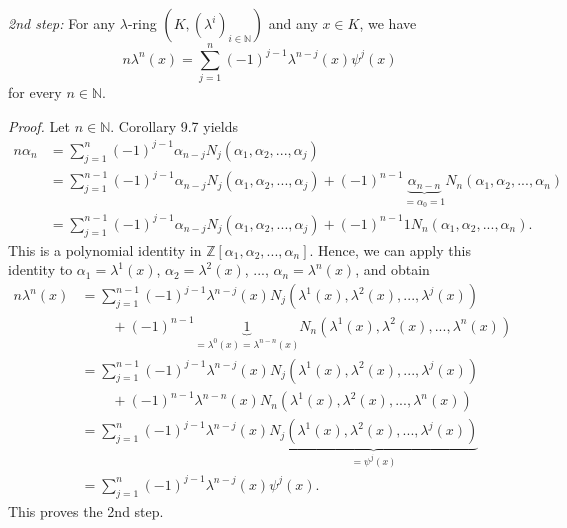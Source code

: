 \documentclass[numbers=enddot,12pt,final,onecolumn,notitlepage]{scrartcl}%
\begin{document}
\textit{2nd step:} For any $\lambda$-ring $\left(  K,\left(  \lambda
^{i}\right)  _{i\in\mathbb{N}}\right)  $ and any $x\in K$, we have%
\[
n\lambda^{n}\left(  x\right)  =\sum_{j=1}^{n}\left(  -1\right)  ^{j-1}%
\lambda^{n-j}\left(  x\right)  \psi^{j}\left(  x\right)
\]
for every $n\in\mathbb{N}$.

\textit{Proof.} Let $n\in\mathbb{N}$. Corollary 9.7 yields%
\begin{align*}
n\alpha_{n}  &  =\sum\limits_{j=1}^{n}\left(  -1\right)  ^{j-1}\alpha
_{n-j}N_{j}\left(  \alpha_{1},\alpha_{2},...,\alpha_{j}\right) \\
&  =\sum\limits_{j=1}^{n-1}\left(  -1\right)  ^{j-1}\alpha_{n-j}N_{j}\left(
\alpha_{1},\alpha_{2},...,\alpha_{j}\right)  +\left(  -1\right)
^{n-1}\underbrace{\alpha_{n-n}}_{=\alpha_{0}=1}N_{n}\left(  \alpha_{1}%
,\alpha_{2},...,\alpha_{n}\right) \\
&  =\sum\limits_{j=1}^{n-1}\left(  -1\right)  ^{j-1}\alpha_{n-j}N_{j}\left(
\alpha_{1},\alpha_{2},...,\alpha_{j}\right)  +\left(  -1\right)  ^{n-1}%
1N_{n}\left(  \alpha_{1},\alpha_{2},...,\alpha_{n}\right)  .
\end{align*}
This is a polynomial identity in $\mathbb{Z}\left[  \alpha_{1},\alpha
_{2},...,\alpha_{n}\right]  $. Hence, we can apply this identity to
$\alpha_{1}=\lambda^{1}\left(  x\right)  $, $\alpha_{2}=\lambda^{2}\left(
x\right)  $, $...$, $\alpha_{n}=\lambda^{n}\left(  x\right)  $, and obtain%
\begin{align*}
n\lambda^{n}\left(  x\right)   &  =\sum_{j=1}^{n-1}\left(  -1\right)
^{j-1}\lambda^{n-j}\left(  x\right)  N_{j}\left(  \lambda^{1}\left(  x\right)
,\lambda^{2}\left(  x\right)  ,...,\lambda^{j}\left(  x\right)  \right) \\
&  \ \ \ \ \ \ \ \ \ \ +\left(  -1\right)  ^{n-1}\underbrace{1}_{=\lambda
^{0}\left(  x\right)  =\lambda^{n-n}\left(  x\right)  }N_{n}\left(
\lambda^{1}\left(  x\right)  ,\lambda^{2}\left(  x\right)  ,...,\lambda
^{n}\left(  x\right)  \right) \\
&  =\sum_{j=1}^{n-1}\left(  -1\right)  ^{j-1}\lambda^{n-j}\left(  x\right)
N_{j}\left(  \lambda^{1}\left(  x\right)  ,\lambda^{2}\left(  x\right)
,...,\lambda^{j}\left(  x\right)  \right) \\
&  \ \ \ \ \ \ \ \ \ \ +\left(  -1\right)  ^{n-1}\lambda^{n-n}\left(
x\right)  N_{n}\left(  \lambda^{1}\left(  x\right)  ,\lambda^{2}\left(
x\right)  ,...,\lambda^{n}\left(  x\right)  \right) \\
&  =\sum_{j=1}^{n}\left(  -1\right)  ^{j-1}\lambda^{n-j}\left(  x\right)
\underbrace{N_{j}\left(  \lambda^{1}\left(  x\right)  ,\lambda^{2}\left(
x\right)  ,...,\lambda^{j}\left(  x\right)  \right)  }_{=\psi^{j}\left(
x\right)  }\\
&  =\sum_{j=1}^{n}\left(  -1\right)  ^{j-1}\lambda^{n-j}\left(  x\right)
\psi^{j}\left(  x\right)  .
\end{align*}
This proves the 2nd step.
\end{document}
